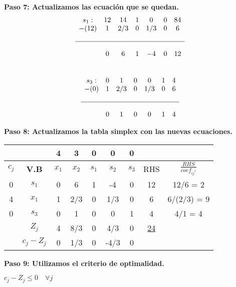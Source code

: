 \documentclass{templateNote}
\begin{document}
\textbf{Paso 7: Actualizamos las ecuación que se quedan.}
\begin{equation*}
    \begin{array}{ccccccc}
        s_1: & 12 & 14 & 1 & 0 & 0 & 84 \\
        -(12) & 1 & 2/3 & 0 & 1/3 & 0 & 6 \\
        \\ \hline \\
        & 0 & 6 & 1 & -4 & 0 & 12 
    \end{array}
\end{equation*}
\\
\begin{equation*}
    \begin{array}{ccccccc}
        s_3: & 0 & 1 & 0 & 0 & 1 & 4 \\
        -(0) & 1 & 2/3 & 0 & 1/3 & 0 & 6 \\
        \\ \hline \\
        & 0 & 1 & 0 & 0 & 1 & 4 
    \end{array}
\end{equation*}

\textbf{Paso 8: Actualizamos la tabla simplex con las nuevas ecuaciones.}
\begin{center}
    \begin{tabular}{|c|c|c|c|c|c|c|c|c|}
        \hline
        & & 4 & 3 & 0 & 0 & 0 &  &  \\ \hline
        $c_j$ & \textbf{V.B} & $x_1$ & $x_2$ & $s_1$ & $s_2$ & $s_3$ & RHS & $\displaystyle\frac{RHS}{coef_{ij^*}}$ \\ \hline
        0 & $s_1$ & 0 & 6 & 1 & -4 & 0 & 12 & 12/6 = 2\\ \hline
        4 & $x_1$ & 1 & 2/3 & 0 & 1/3 & 0 & 6 & 6/(2/3) = 9\\ \hline
        0 & $s_3$ & 0 & 1 & 0 & 0 & 1 & 4 & 4/1 = 4\\ \hline
        & $Z_j$ & 4 & 8/3 & 0 & 4/3 & 0 & \underline{24} &  \\ \hline
        & $c_j - Z_j$ & 0 & 1/3 & 0 & -4/3 & 0 &  &  \\ \hline
    \end{tabular}
\end{center}

\textbf{Paso 9: Utilizamos el criterio de optimalidad.}
\begin{center}
    $c_j - Z_j \leq 0 \quad \forall j$
\end{center}
\end{document}

